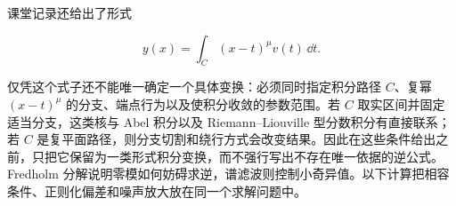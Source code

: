 课堂记录还给出了形式

\[
y(x)=\int_C(x-t)^\mu v(t)\,\dd t.
\]

仅凭这个式子还不能唯一确定一个具体变换：必须同时指定积分路径 $C$、复幂 $(x-t)^\mu$ 的分支、端点行为以及使积分收敛的参数范围。若 $C$ 取实区间并固定适当分支，这类核与 Abel 积分以及 Riemann--Liouville 型分数积分有直接联系；若 $C$ 是复平面路径，则分支切割和绕行方式会改变结果。因此在这些条件给出之前，只把它保留为一类形式积分变换，而不强行写出不存在唯一依据的逆公式。
Fredholm 分解说明零模如何妨碍求逆，谱滤波则控制小奇异值。以下计算把相容条件、正则化偏差和噪声放大放在同一个求解问题中。






